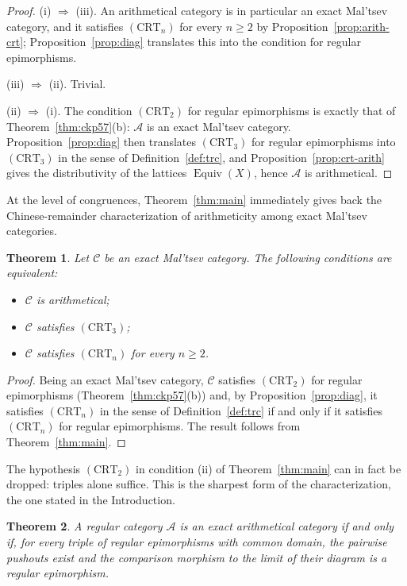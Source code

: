 \documentclass[11pt,a4paper]{article}
\theoremstyle{plain}
\newtheorem{theoreme}{Theorem}[section]
\theoremstyle{definition}
\theoremstyle{remark}
\theoremstyle{plain}
\newcommand{\C}{\mathcal{C}}
\newcommand{\Equiv}{\operatorname{Equiv}}
\begin{document}
\begin{proof}
(i) $\Rightarrow$ (iii). An arithmetical category is in particular an
exact Mal'tsev category, and it satisfies $(\mathrm{CRT}_n)$ for every
$n \ge 2$ by Proposition~\ref{prop:arith-crt};
Proposition~\ref{prop:diag} translates this into the condition for regular
epimorphisms.

(iii) $\Rightarrow$ (ii). Trivial.

(ii) $\Rightarrow$ (i). The condition $(\mathrm{CRT}_2)$ for regular
epimorphisms is exactly that of Theorem~\ref{thm:ckp57}(b):
$\mathcal{A}$ is an exact Mal'tsev category.
Proposition~\ref{prop:diag} then translates $(\mathrm{CRT}_3)$ for
regular epimorphisms into $(\mathrm{CRT}_3)$ in the sense of
Definition~\ref{def:trc}, and Proposition~\ref{prop:crt-arith} gives the
distributivity of the lattices $\Equiv(X)$, hence $\mathcal{A}$ is
arithmetical.
\end{proof}

At the level of congruences, Theorem~\ref{thm:main} immediately gives
back the Chinese-remainder characterization of arithmeticity among exact
Mal'tsev categories.

\begin{theoreme}\label{thm:principal}
Let $\C$ be an exact Mal'tsev category. The following conditions are
equivalent:
\begin{itemize}
\item[(i)] $\C$ is arithmetical;
\item[(ii)] $\C$ satisfies $(\mathrm{CRT}_3)$;
\item[(iii)] $\C$ satisfies $(\mathrm{CRT}_n)$ for every $n \ge 2$.
\end{itemize}
\end{theoreme}

\begin{proof}
Being an exact Mal'tsev category, $\C$ satisfies $(\mathrm{CRT}_2)$ for
regular epimorphisms (Theorem~\ref{thm:ckp57}(b)) and, by
Proposition~\ref{prop:diag}, it satisfies $(\mathrm{CRT}_n)$ in the sense
of Definition~\ref{def:trc} if and only if it satisfies
$(\mathrm{CRT}_n)$ for regular epimorphisms. The result follows from Theorem~\ref{thm:main}.\end{proof}

The hypothesis $(\mathrm{CRT}_2)$ in condition (ii) of
Theorem~\ref{thm:main} can in fact be dropped: triples alone suffice.
This is the sharpest form of the characterization, the one stated in the
Introduction.

\begin{theoreme}\label{cor:diag}
A regular category $\mathcal{A}$ is an exact arithmetical category
if and only if, for every triple of regular epimorphisms with common
domain, the pairwise pushouts exist and the comparison morphism to the
limit of their diagram is a regular epimorphism.
\end{theoreme}
\end{document}
